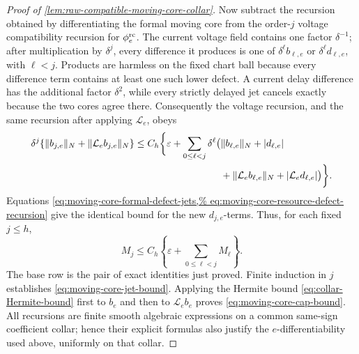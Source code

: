 \begin{proof}[Proof of \cref{lem:raw-compatible-moving-core-collar}]
Now subtract the recursion obtained by differentiating the formal moving
core from the order-\(j\) voltage compatibility recursion for
\(\phi_e^{\rm rc}\).  The current voltage field contains one factor
\(\delta^{-1}\); after multiplication by \(\delta^j\), every difference
it produces is one of
\(\delta^\ell b_{\ell,e}\) or
\(\delta^\ell d_{\ell,e}\), with \(\ell<j\).  Products are harmless on
the fixed chart ball because every difference term contains at least one
such lower defect.  A current delay difference has the additional factor
\(\delta^2\), while every strictly delayed jet cancels exactly because the
two cores agree there.  Consequently the voltage recursion, and the same
recursion after applying \(\mathcal L_e\), obeys
\begin{align}
 \delta^j\{\|b_{j,e}\|_N+\|\mathcal L_eb_{j,e}\|_N\}
 \le C_h\biggl\{\varepsilon
  +\sum_{0\le\ell<j}\delta^\ell
   \bigl(&\|b_{\ell,e}\|_N+|d_{\ell,e}|\notag\\
         &+\|\mathcal L_eb_{\ell,e}\|_N
          +|\mathcal L_ed_{\ell,e}|\bigr)\biggr\}.           \label{eq:moving-core-voltage-defect-recursion}
\end{align}
Equations \cref{eq:moving-core-formal-defect-jets,%
eq:moving-core-resource-defect-recursion} give the identical bound for the
new \(d_{j,e}\)-terms.  Thus, for each fixed \(j\le h\),
\begin{equation}
 M_j\le C_h\left\{\varepsilon+
                  \sum_{0\le\ell<j}M_\ell\right\}.           \label{eq:moving-core-triangular-induction}
\end{equation}
The base row is the pair of exact identities just proved.  Finite induction
in \(j\) establishes \cref{eq:moving-core-jet-bound}.  Applying the Hermite
bound \cref{eq:collar-Hermite-bound} first to \(b_e\) and then to
\(\mathcal L_eb_e\) proves \cref{eq:moving-core-cap-bound}.
All recursions are finite smooth algebraic expressions on a common
same-sign coefficient collar; hence their explicit formulas also justify
the \(e\)-differentiability used above, uniformly on that collar.


\end{proof}
